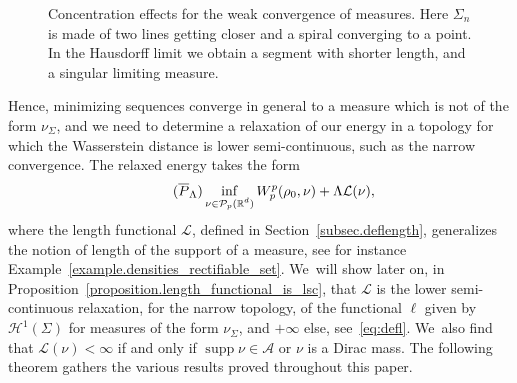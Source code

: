 \documentclass[10pt]{amsart}
\let\ts\textstyle
\theoremstyle{definition}
\newcommand\LM[1]{\hbox{\vrule width.5pt \vbox to#1pt{\vfill \hrule width#1pt height.5pt}}}
\newcommand\LL{{\mathchoice {\>\LM7\>}{\>\LM7\>}{\,\LM5\,}{\,\LM{3.35}\,}}}
\newcommand{\mres}{\LL}
\newcommand\cH{\mathcal{H}}
\newcommand{\RR}{\mathbb{R}}
\DeclareMathOperator{\supp}{supp}
\newcommand{\distH}{d_{\mathcal{H}}}
\begin{document}
\begin{figure}[t]
{
}
\caption{Concentration effects for the weak convergence of measures. Here $\Sigma_n$ is made of two lines getting closer and a spiral converging to a point. In the Hausdorff limit we obtain a segment with shorter length, and a singular limiting measure.}\label{figure.concentration_sets_measure}
\vspace*{-.1\baselineskip}
\end{figure}

Hence, minimizing sequences converge in general to a measure which is
not of the form $\nu_\Sigma$, and we need to determine a relaxation of our energy in a topology for which the Wasserstein distance is lower semi-continuous, such as the narrow convergence.
The relaxed energy takes the form
\begin{equation}\label{problem.shape_optimization_relaxed}
\tag{$\overline{P}_\Lambda$}
\inf_{
\substack{
\nu \in \mathcal{P}_p(\RR^d)
}
}
W_p^p(\rho_0, \nu) + \Lambda \mathcal{L}(\nu),
\end{equation}
where the length functional $\mathcal{L}$, defined in Section~\ref{subsec.deflength}, generalizes the notion of length of the support of a measure, see for instance Example~\ref{example.densities_rectifiable_set}. We~will show later on, in Proposition~\ref{proposition.length_functional_is_lsc},
that $\mathcal{L}$ is the lower semi-continuous relaxation, for the narrow topology, of the functional $\ell$ given by $\cH^1(\Sigma)$ for measures
of the form $\nu_\Sigma$, and $+\infty$ else, see~\eqref{eq:defl}. We~also find that $\mathcal{L}(\nu) < \infty$ if and only if $\supp \nu \in \mathcal{A}$ or $\nu$ is a Dirac mass. The following theorem gathers the various results proved throughout this paper.
\end{document}
